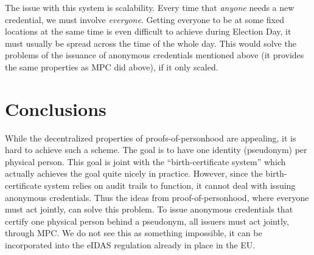 The issue with this system is scalability.
Every time that \emph{anyone} needs a new credential, we must involve 
\emph{everyone}.
Getting everyone to be at some fixed locations at the same time is even 
difficult to achieve during Election Day, it must usually be spread across the 
time of the whole day.
This would solve the problems of the issuance of anonymous credentials 
mentioned above (it provides the same properties as \ac{MPC} did above), if it 
only scaled.


\section{Conclusions}

While the decentralized properties of proofs-of-personhood are appealing, it is 
hard to achieve such a scheme.
The goal is to have one identity (pseudonym) per physical person.
This goal is joint with the \enquote{birth-certificate system} which actually 
achieves the goal quite nicely in practice.
However, since the birth-certificate system relies on audit trails to function, 
it cannot deal with issuing anonymous credentials.
Thus the ideas from proof-of-personhood, where everyone must act jointly, can 
solve this problem.
To issue anonymous credentials that certify one physical person behind a 
pseudonym, all issuers must act jointly, \eg through \ac{MPC}.
We do not see this as something impossible, \eg it can be incorporated into the 
eIDAS regulation already in place in the EU.
